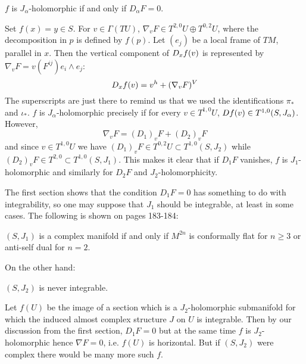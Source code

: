 \documentclass{scrartcl}
\begin{document}
\begin{prop}
	$f$ is $J_\alpha$-holomorphic if and only if $D_\alpha F=0$.
\end{prop}
\begin{myproof}
	Set $f(x)=y\in S$. For $v\in \Gamma(TU)$, $\nabla_v F\in T^{2,0}U\oplus T^{0,2}U$, where the decomposition in $p$ is defined by $f(p)$. Let $(e_j)$ be a local frame of $TM$, parallel in $x$. Then the vertical component of $D_x f(v)$ is represented by $\nabla_v F=v(F^{ij}) e_i\wedge e_j$:
	\begin{equation*}
		D_x f(v)=v^h+(\nabla_v F)^V
	\end{equation*}
	The superscripts are just there to remind us that we used the identifications $\pi_*$ and $\iota_*$. $f$ is $J_\alpha$-holomorphic precisely if for every $v\in T^{1,0}U$, $D f (v)\in T^{1,0}(S,J_\alpha)$. However, 
	\begin{equation*}
		\nabla_v F=(D_1)_v F+(D_2)_v F
	\end{equation*}
	and since $v\in T^{1,0}U$ we have $(D_1)_vF\in T^{0,2}U\subset T^{1,0}(S,J_2)$ while $(D_2)_vF\in T^{2,0}\subset T^{1,0}(S,J_1)$. This makes it clear that if $D_1 F$ vanishes, $f$ is $J_1$-holomorphic and similarly for $D_2 F$ and $J_2$-holomorphicity.
\end{myproof}

The first section shows that the condition $D_1 F=0$ has something to do with integrability, so one may suppose that $J_1$ should be integrable, at least in some cases. The following is shown on pages 183-184:

\begin{prop}
	$(S,J_1)$ is a complex manifold if and only if $M^{2n}$ is conformally flat for $n\geq 3$ or anti-self dual for $n=2$.
\end{prop}

On the other hand:

\begin{prop}
	$(S,J_2)$ is never integrable.
\end{prop}
\begin{myproof}
	Let $f(U)$ be the image of a section which is a $J_2$-holomorphic submanifold for which the induced almost complex structure $J$ on $U$ is integrable. Then by our discussion from the first section, $D_1 F=0$ but at the same time $f$ is $J_2$-holomorphic hence $\nabla F=0$, i.e. $f(U)$ is horizontal. But if $(S,J_2)$ were complex there would be many more such $f$.
\end{myproof}
\end{document}
